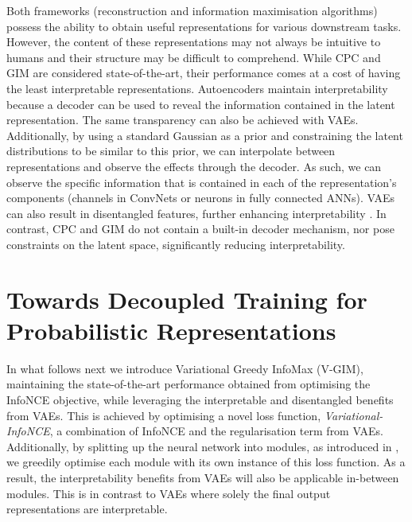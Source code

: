 		
		Both frameworks (reconstruction and information maximisation algorithms) possess the ability to obtain useful representations for various downstream tasks. However, the content of these representations may not always be intuitive to humans and their structure may be difficult to comprehend. While CPC and GIM are considered state-of-the-art, their performance comes at a cost of having the least interpretable representations. Autoencoders maintain interpretability because a decoder can be used to reveal the information contained in the latent representation. The same transparency can also be achieved with VAEs. Additionally, by using a standard Gaussian as a prior and constraining the latent distributions to be similar to this prior, we can interpolate between representations and observe the effects through the decoder. As such, we can observe the specific information that is contained in each of the representation's components (channels in ConvNets or neurons in fully connected ANNs). VAEs can also result in disentangled features, further enhancing interpretability \citep{grossuttiDeepLearningInfrared2022}. In contrast, CPC and GIM do not contain a built-in decoder mechanism, nor pose constraints on the latent space, significantly reducing interpretability.
		


\section{Towards Decoupled Training for Probabilistic Representations} \label{cha:vgim_decoupled_training_for_probabil_repr}
		In what follows next we introduce Variational Greedy InfoMax (V-GIM), maintaining the state-of-the-art performance obtained from optimising the InfoNCE objective, while leveraging the interpretable and disentangled benefits from VAEs. This is achieved by optimising a novel loss function, \textit{Variational-InfoNCE}, a combination of InfoNCE and the regularisation term from VAEs. Additionally, by splitting up the neural network into modules, as introduced in \citep{lowePuttingEndEndtoEnd2020a}, we greedily optimise each module with its own instance of this loss function. As a result, the interpretability benefits from VAEs will also be applicable in-between modules. This is in contrast to VAEs where solely the final output representations are interpretable.		
				
		
